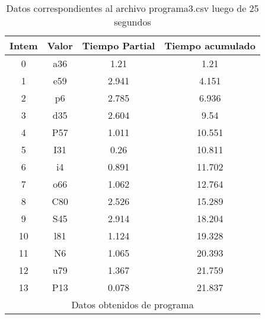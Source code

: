 \begin{table}[ht!]
\center

\caption{Datos correspondientes al archivo programa3.csv luego de 25 segundos}
\label{tab:programa3}
\begin{tabular}{|c|c|c|c|}
\toprule
Intem & Valor & Tiempo Partial & Tiempo acumulado \\
\midrule
0 & a36 & 1.21 & 1.21 \\
1 & e59 & 2.941 & 4.151 \\
2 & p6 & 2.785 & 6.936 \\
3 & d35 & 2.604 & 9.54 \\
4 & P57 & 1.011 & 10.551 \\
5 & I31 & 0.26 & 10.811 \\
6 & i4 & 0.891 & 11.702 \\
7 & o66 & 1.062 & 12.764 \\
8 & C80 & 2.526 & 15.289 \\
9 & S45 & 2.914 & 18.204 \\
10 & l81 & 1.124 & 19.328 \\
11 & N6 & 1.065 & 20.393 \\
12 & u79 & 1.367 & 21.759 \\
13 & P13 & 0.078 & 21.837 \\
\hline \multicolumn{4}{|c|}{Datos obtenidos de programa} \\


\bottomrule
\end{tabular}
\end{table}
